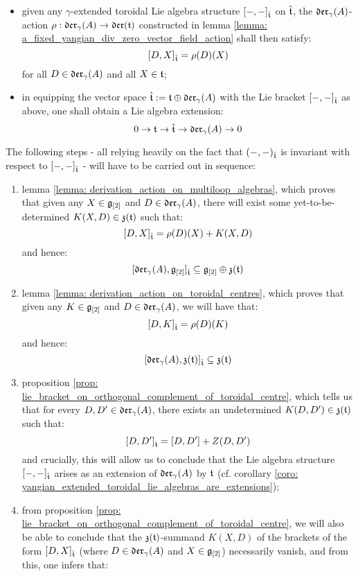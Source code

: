 \begin{itemize}
\begin{itemize}
                \item given any $\gamma$-extended toroidal Lie algebra structure $[-, -]_{\hat{\mathfrak{t}}}$ on $\hat{\mathfrak{t}}$, the $\mathfrak{der}_{\gamma}(A)$-action $\rho: \mathfrak{der}_{\gamma}(A) \to \mathfrak{der}(\mathfrak{t})$ constructed in lemma \ref{lemma: a_fixed_yangian_div_zero_vector_field_action} shall then satisfy:
                    $$[D, X]_{\hat{\mathfrak{t}}} = \rho(D)(X)$$
                for all $D \in \mathfrak{der}_{\gamma}(A)$ and all $X \in \mathfrak{t}$;
                \item in equipping the vector space $\hat{\mathfrak{t}} := \mathfrak{t} \oplus \mathfrak{der}_{\gamma}(A)$ with the Lie bracket $[-, -]_{\hat{\mathfrak{t}}}$ as above, one shall obtain a Lie algebra extension:
                    $$0 \to \mathfrak{t} \to \hat{\mathfrak{t}} \to \mathfrak{der}_{\gamma}(A) \to 0$$
            \end{itemize}
            The following steps - all relying heavily on the fact that $(-, -)_{\hat{\mathfrak{t}}}$ is invariant with respect to $[-, -]_{\hat{\mathfrak{t}}}$ - will have to be carried out in sequence:
            \begin{enumerate}
                \item lemma \ref{lemma: derivation_action_on_multiloop_algebras}, which proves that given any $X \in \mathfrak{g}_{[2]}$ and $D \in \mathfrak{der}_{\gamma}(A)$, there will exist some yet-to-be-determined $K(X, D) \in \mathfrak{z}(\mathfrak{t})$ such that:
                    $$[D, X]_{\hat{\mathfrak{t}}} = \rho(D)(X) + K(X, D)$$
                and hence:
                    $$[\mathfrak{der}_{\gamma}(A), \mathfrak{g}_{[2]}]_{\hat{\mathfrak{t}}} \subseteq \mathfrak{g}_{[2]} \oplus \mathfrak{z}(\mathfrak{t})$$
                \item lemma \ref{lemma: derivation_action_on_toroidal_centres}, which proves that given any $K \in \mathfrak{g}_{[2]}$ and $D \in \mathfrak{der}_{\gamma}(A)$, we will have that:
                    $$[D, K]_{\hat{\mathfrak{t}}} = \rho(D)(K)$$
                and hence:
                    $$[\mathfrak{der}_{\gamma}(A), \mathfrak{z}(\mathfrak{t})]_{\hat{\mathfrak{t}}} \subseteq \mathfrak{z}(\mathfrak{t})$$
                \item proposition \ref{prop: lie_bracket_on_orthogonal_complement_of_toroidal_centre}, which tells us that for every $D, D' \in \mathfrak{der}_{\gamma}(A)$, there exists an undetermined $K(D, D') \in \mathfrak{z}(\mathfrak{t})$ such that:
                    $$[D, D']_{\hat{\mathfrak{t}}} = [D, D'] + Z(D, D')$$
                and crucially, this will allow us to conclude that the Lie algebra structure $[-, -]_{\hat{\mathfrak{t}}}$ arises as an extension of $\mathfrak{der}_{\gamma}(A)$ by $\mathfrak{t}$ (cf. corollary \ref{coro: yangian_extended_toroidal_lie_algebras_are_extensions});
                \item from proposition \ref{prop: lie_bracket_on_orthogonal_complement_of_toroidal_centre}, we will also be able to conclude that the $\mathfrak{z}(\mathfrak{t})$-summand $K(X, D)$ of the brackets of the form $[D, X]_{\hat{\mathfrak{t}}}$ (where $D \in \mathfrak{der}_{\gamma}(A)$ and $X \in \mathfrak{g}_{[2]}$) necessarily vanish, and from this, one infers that:

\end{enumerate}
\end{itemize}
